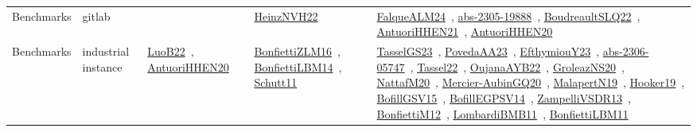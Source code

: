 {\begin{longtable}{lp{3cm}>{\raggedright\arraybackslash}p{6cm}>{\raggedright\arraybackslash}p{6cm}>{\raggedright\arraybackslash}p{8cm}}
\index{gitlab}\index{Benchmarks!gitlab}Benchmarks & gitlab &  & \href{../works/HeinzNVH22.pdf}{HeinzNVH22}~\cite{HeinzNVH22} & \href{../works/FalqueALM24.pdf}{FalqueALM24}~\cite{FalqueALM24}, \href{../works/abs-2305-19888.pdf}{abs-2305-19888}~\cite{abs-2305-19888}, \href{../works/BoudreaultSLQ22.pdf}{BoudreaultSLQ22}~\cite{BoudreaultSLQ22}, \href{../works/AntuoriHHEN21.pdf}{AntuoriHHEN21}~\cite{AntuoriHHEN21}, \href{../works/AntuoriHHEN20.pdf}{AntuoriHHEN20}~\cite{AntuoriHHEN20}\\
\index{industrial instance}\index{Benchmarks!industrial instance}Benchmarks & industrial instance & \href{../works/LuoB22.pdf}{LuoB22}~\cite{LuoB22}, \href{../works/AntuoriHHEN20.pdf}{AntuoriHHEN20}~\cite{AntuoriHHEN20} & \href{../works/BonfiettiZLM16.pdf}{BonfiettiZLM16}~\cite{BonfiettiZLM16}, \href{../works/BonfiettiLBM14.pdf}{BonfiettiLBM14}~\cite{BonfiettiLBM14}, \href{../works/Schutt11.pdf}{Schutt11}~\cite{Schutt11} & \href{../works/TasselGS23.pdf}{TasselGS23}~\cite{TasselGS23}, \href{../works/PovedaAA23.pdf}{PovedaAA23}~\cite{PovedaAA23}, \href{../works/EfthymiouY23.pdf}{EfthymiouY23}~\cite{EfthymiouY23}, \href{../works/abs-2306-05747.pdf}{abs-2306-05747}~\cite{abs-2306-05747}, \href{../works/Tassel22.pdf}{Tassel22}~\cite{Tassel22}, \href{../works/OujanaAYB22.pdf}{OujanaAYB22}~\cite{OujanaAYB22}, \href{../works/GroleazNS20.pdf}{GroleazNS20}~\cite{GroleazNS20}, \href{../works/NattafM20.pdf}{NattafM20}~\cite{NattafM20}, \href{../works/Mercier-AubinGQ20.pdf}{Mercier-AubinGQ20}~\cite{Mercier-AubinGQ20}, \href{../works/MalapertN19.pdf}{MalapertN19}~\cite{MalapertN19}, \href{../works/Hooker19.pdf}{Hooker19}~\cite{Hooker19}, \href{../works/BofillGSV15.pdf}{BofillGSV15}~\cite{BofillGSV15}, \href{../works/BofillEGPSV14.pdf}{BofillEGPSV14}~\cite{BofillEGPSV14}, \href{../works/ZampelliVSDR13.pdf}{ZampelliVSDR13}~\cite{ZampelliVSDR13}, \href{../works/BonfiettiM12.pdf}{BonfiettiM12}~\cite{BonfiettiM12}, \href{../works/LombardiBMB11.pdf}{LombardiBMB11}~\cite{LombardiBMB11}, \href{../works/BonfiettiLBM11.pdf}{BonfiettiLBM11}~\cite{BonfiettiLBM11}\\

\end{longtable}}
